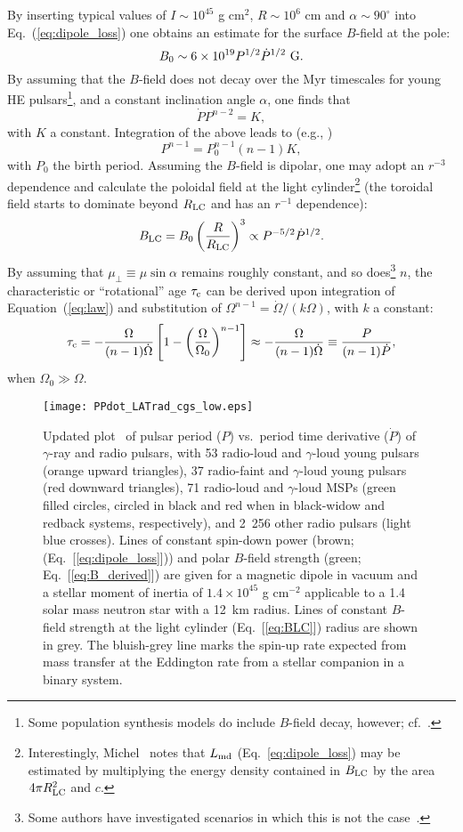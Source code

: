 \documentclass{PoS}
\newcommand{\beq}{\begin{equation}}
\newcommand{\eeq}{\end{equation}}
\begin{document}
By inserting typical values of $I \sim 10^{45}$ g cm$^2$, $R \sim 10^6$ cm and $\alpha \sim 90^{\circ}$ into Eq.~(\ref{eq:dipole_loss}) one obtains an estimate for the surface $B$-field at the pole:
\beq
B_0 \sim 6 \times 10^{19}P^{1/2}\dot{P}^{1/2}~{\rm G}.\label{eq:B_derived}
\eeq
By assuming that the $B$-field does not decay over the Myr timescales for young HE pulsars\footnote{Some population synthesis models do include $B$-field decay, however; cf.~\cite{Han97,Igoshev15,Tauris01}.}, and a constant inclination angle $\alpha$, one finds that~\cite{Venter07} 
\beq
\dot{P}P^{n-2} = K,
\eeq
with $K$ a constant. Integration of the above leads to (e.g., \cite{Venter15})
\beq
P^{n-1} = P_0^{n-1}(n-1)K,
\eeq
with $P_0$ the birth period. Assuming the $B$-field is dipolar, one may adopt an $r^{-3}$ dependence and calculate the poloidal field at the light cylinder\footnote{Interestingly, Michel~\cite{Michel91} notes that $L_{\rm md}$ (Eq.~\ref{eq:dipole_loss}) may be estimated by multiplying the energy density contained in $B_{\rm LC}$ by the area $4\pi R^2_{\rm LC}$ and $c$.} (the toroidal field starts to dominate beyond $R_{\rm LC}$ and has an $r^{-1}$ dependence):
\beq
B_{\rm LC}= B_0\left(\frac{R}{R_{\rm LC}}\right)^3\propto P^{-5/2}\dot{P}^{1/2}.\label{eq:BLC}
\eeq
By assuming that $\mu_{\bot} \equiv \mu\sin\alpha$ remains roughly constant, and so does\footnote{Some authors have investigated scenarios in which this is not the case~\cite{Aris17,Tauris01}.} $n$, the characteristic or ``rotational'' age $\tau_{\rm c}$ can be derived upon integration of Equation~(\ref{eq:law}) and substitution of $\Omega^{n-1} = \dot{\Omega}/(k\Omega)$, with $k$ a constant:
\beq
\tau_{\rm c} = -\frac{\Omega}{(n-1)\dot{\Omega}}\left[1-\left(\frac{\Omega}{\Omega_0}\right)^{n-1}\right] \approx -\frac{\Omega}{(n-1)\dot{\Omega}} \equiv \frac{P}{(n-1)\dot{P}} \label{eq:age},
\eeq
when $\Omega_0 \gg \Omega$.
\begin{figure}[t]
  \begin{center}
  \texttt{[image: PPdot\_LATrad\_cgs\_low.eps]}
  \caption{Updated plot~\cite{Grenier15} of pulsar period ($P$) vs.\ period time derivative ($\dot{P}$) of $\gamma$-ray and radio pulsars, with 53 radio-loud and
$\gamma$-loud young pulsars (orange upward triangles), 37 radio-faint and $\gamma$-loud young pulsars (red downward triangles), 71 radio-loud and
$\gamma$-loud MSPs (green filled circles, circled in black and red when in black-widow and redback systems, respectively), and
2~256 other radio pulsars (light blue crosses). %
Lines of constant spin-down power (brown; (Eq.~[\ref{eq:dipole_loss}])) and polar $B$-field strength (green; Eq.~[\ref{eq:B_derived}]) are given for a magnetic
dipole in vacuum and a stellar moment of inertia of $1.4 \times 10^{45}$ g cm$^{-2}$ applicable to a 1.4 solar mass neutron star with a 12~km
radius. Lines of constant $B$-field strength at the light cylinder (Eq.~[\ref{eq:BLC}]) radius are shown in grey. The bluish-grey line marks the spin-up rate expected from mass transfer at the Eddington rate from a stellar companion in a binary system.}
  \label{fig:PPdot}
  \end{center}
\end{figure}
\end{document}
